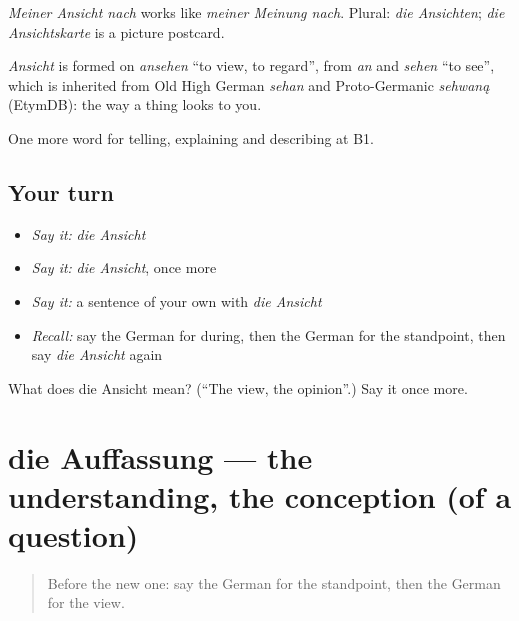 \emph{Meiner Ansicht nach} works like \emph{meiner Meinung nach}. Plural: \emph{die Ansichten}; \emph{die Ansichtskarte} is a picture postcard.

\begin{cousinweb}
\emph{Ansicht} is formed on \emph{ansehen} \textquotedblleft{}to view, to regard\textquotedblright{}, from \emph{an} and \emph{sehen} \textquotedblleft{}to see\textquotedblright{}, which is inherited from Old High German \emph{sehan} and Proto-Germanic \emph{sehwaną} (EtymDB): the way a thing looks to you.
\end{cousinweb}

\begin{grammarlens}[title={What you've built}]
One more word for telling, explaining and describing at B1.
\end{grammarlens}

\subsection*{Your turn}
\begin{itemize}
\raggedright
  \item \emph{Say it:} \emph{die Ansicht}
  \item \emph{Say it:} \emph{die Ansicht}, once more
  \item \emph{Say it:} a sentence of your own with \emph{die Ansicht}
  \item \emph{Recall:} say the German for during, then the German for the standpoint, then say \emph{die Ansicht} again
\end{itemize}

\begin{tcolorbox}[breakable,colback=teal!4,colframe=teal!35!black,title={Before you move on}]
What does die Ansicht mean? (\textquotedblleft{}The view, the opinion\textquotedblright{}.) Say it once more.
\end{tcolorbox}
\section[die Auffassung]{die Auffassung — the understanding, the conception (of a question)}

\label{lesson:GE-C330-auffassung}



\begin{quote}
Before the new one: say the German for the standpoint, then the German for the view.
\end{quote}

